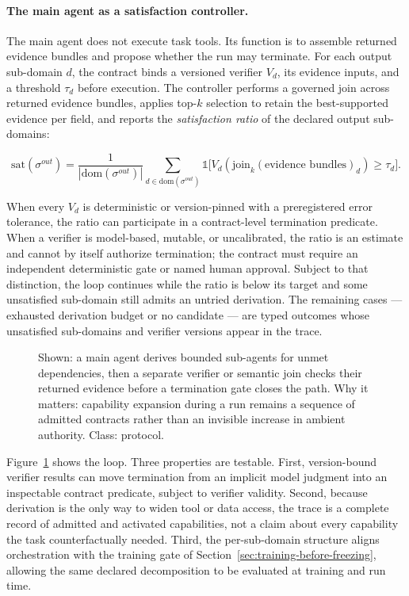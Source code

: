 \paragraph{The main agent as a satisfaction controller.}
The main agent does not execute task tools. Its function is to assemble returned evidence bundles and propose whether the run may terminate. For each output sub-domain $d$, the contract binds a versioned verifier $V_d$, its evidence inputs, and a threshold $\tau_d$ before execution. The controller performs a governed join across returned evidence bundles, applies top-$k$ selection to retain the best-supported evidence per field, and reports the \textit{satisfaction ratio} of the declared output sub-domains:

\begin{equation}
\mathrm{sat}(\sigma^{out})=\frac{1}{|\mathrm{dom}(\sigma^{out})|}\sum_{d\in\mathrm{dom}(\sigma^{out})} \mathbb{1}\big[V_d(\mathrm{join}_k(\text{evidence bundles})_d)\geq\tau_d\big].
\end{equation}

When every $V_d$ is deterministic or version-pinned with a preregistered error tolerance, the ratio can participate in a contract-level termination predicate. When a verifier is model-based, mutable, or uncalibrated, the ratio is an estimate and cannot by itself authorize termination; the contract must require an independent deterministic gate or named human approval. Subject to that distinction, the loop continues while the ratio is below its target and some unsatisfied sub-domain still admits an untried derivation. The remaining cases --- exhausted derivation budget or no candidate --- are typed outcomes whose unsatisfied sub-domains and verifier versions appear in the trace.

\begin{figure}[t]
\centering
\caption{Shown: a main agent derives bounded sub-agents for unmet dependencies, then a separate verifier or semantic join checks their returned evidence before a termination gate closes the path. Why it matters: capability expansion during a run remains a sequence of admitted contracts rather than an invisible increase in ambient authority. Class: protocol.}
\label{fig:derivation-closure}
\end{figure}

Figure~\ref{fig:derivation-closure} shows the loop. Three properties are testable. First, version-bound verifier results can move termination from an implicit model judgment into an inspectable contract predicate, subject to verifier validity. Second, because derivation is the only way to widen tool or data access, the trace is a complete record of admitted and activated capabilities, not a claim about every capability the task counterfactually needed. Third, the per-sub-domain structure aligns orchestration with the training gate of Section~\ref{sec:training-before-freezing}, allowing the same declared decomposition to be evaluated at training and run time.


